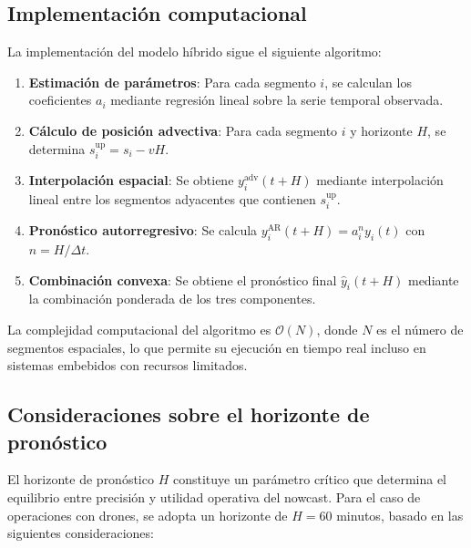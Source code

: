 \documentclass[
  spanish,
  us-letterpaper,
]{scrreprt}
\numberwithin{equation}{section}
\begin{document}
\subsection{Implementación
computacional}\label{implementaciuxf3n-computacional-2}

La implementación del modelo híbrido sigue el siguiente algoritmo:

\begin{enumerate}
\def\labelenumi{\arabic{enumi}.}
\item
  \textbf{Estimación de parámetros}: Para cada segmento \(i\), se
  calculan los coeficientes \(a_i\) mediante regresión lineal sobre la
  serie temporal observada.
\item
  \textbf{Cálculo de posición advectiva}: Para cada segmento \(i\) y
  horizonte \(H\), se determina \(s_i^{\text{up}} = s_i - vH\).
\item
  \textbf{Interpolación espacial}: Se obtiene \(y_i^{\text{adv}}(t+H)\)
  mediante interpolación lineal entre los segmentos adyacentes que
  contienen \(s_i^{\text{up}}\).
\item
  \textbf{Pronóstico autorregresivo}: Se calcula
  \(y_i^{\text{AR}}(t+H) = a_i^n y_i(t)\) con \(n = H/\Delta t\).
\item
  \textbf{Combinación convexa}: Se obtiene el pronóstico final
  \(\hat{y}_i(t+H)\) mediante la combinación ponderada de los tres
  componentes.
\end{enumerate}

La complejidad computacional del algoritmo es \(\mathcal{O}(N)\), donde
\(N\) es el número de segmentos espaciales, lo que permite su ejecución
en tiempo real incluso en sistemas embebidos con recursos limitados.

\subsection{Consideraciones sobre el horizonte de
pronóstico}\label{consideraciones-sobre-el-horizonte-de-pronuxf3stico}

El horizonte de pronóstico \(H\) constituye un parámetro crítico que
determina el equilibrio entre precisión y utilidad operativa del
nowcast. Para el caso de operaciones con drones, se adopta un horizonte
de \(H = 60\) minutos, basado en las siguientes consideraciones:
\end{document}
